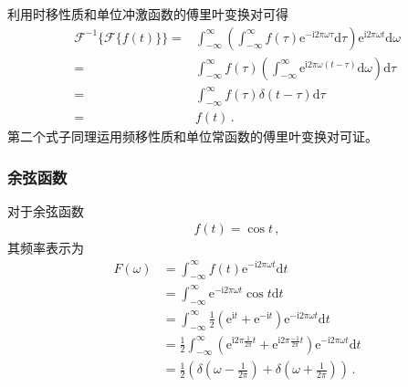 \begin{prove}
    利用时移性质和单位冲激函数的傅里叶变换对可得
    \begin{align}
        \mathcal{F}^{-1}\{\mathcal{F}\{f(t)\}\}= & \int_{-\infty}^{\infty}\left(\int_{-\infty}^{\infty}f(\tau)\mathrm{e}^{-\mathrm{i}2\pi\omega\tau}\mathrm{d}\tau\right)\mathrm{e}^{\mathrm{i}2\pi\omega t}\mathrm{d}\omega\nonumber \\
        =                                        & \int_{-\infty}^{\infty}f(\tau)\left(\int_{-\infty}^{\infty}\mathrm{e}^{\mathrm{i}2\pi\omega(t-\tau)}\mathrm{d}\omega\right)\mathrm{d}\tau\nonumber                                 \\
        =                                        & \int_{-\infty}^{\infty}f(\tau)\delta(t-\tau)\mathrm{d}\tau\nonumber                                                                                                                \\
        =                                        & f(t)\, .
    \end{align}
    第二个式子同理运用频移性质和单位常函数的傅里叶变换对可证。
\end{prove}

\subsubsection*{余弦函数}
对于余弦函数
\begin{align}
    f(t)=\cos t\, ,
\end{align}
其频率表示为
\begin{align}
    F(\omega) & =\int_{-\infty}^{\infty}f(t)\mathrm{e}^{-\mathrm{i}2\pi\omega t}\mathrm{d}t\nonumber                                                                                                \\
              & =\int_{-\infty}^{\infty}\mathrm{e}^{-\mathrm{i}2\pi\omega t}\cos t\mathrm{d}t\nonumber                                                                                              \\
              & =\int_{-\infty}^{\infty}\frac{1}{2}(\mathrm{e}^{\mathrm{i}t}+\mathrm{e}^{-\mathrm{i}t})\mathrm{e}^{-\mathrm{i}2\pi\omega t}\mathrm{d}t\nonumber                                     \\
              & =\frac{1}{2}\int_{-\infty}^{\infty}(\mathrm{e}^{\mathrm{i}2\pi\frac{1}{2\pi}t}+\mathrm{e}^{\mathrm{i}2\pi\frac{-1}{2\pi}t})\mathrm{e}^{-\mathrm{i}2\pi\omega t}\mathrm{d}t\nonumber \\
              & =\frac{1}{2}\left(\delta\left(\omega-\frac{1}{2\pi}\right)+\delta\left(\omega+\frac{1}{2\pi}\right)\right)\, .
\end{align}

